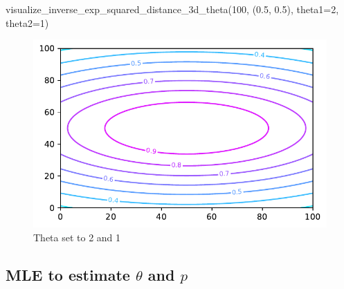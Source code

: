 \documentclass[
  letterpaper,
  DIV=11,
  numbers=noendperiod]{scrreprt}
\newenvironment{Shaded}{\begin{snugshade}}{\end{snugshade}}
\newcommand{\DecValTok}[1]{\textcolor[rgb]{0.68,0.00,0.00}{#1}}
\newcommand{\FloatTok}[1]{\textcolor[rgb]{0.68,0.00,0.00}{#1}}
\newcommand{\NormalTok}[1]{\textcolor[rgb]{0.00,0.23,0.31}{#1}}
\newcommand{\OperatorTok}[1]{\textcolor[rgb]{0.37,0.37,0.37}{#1}}
\begin{document}
\begin{Shaded}
\begin{Highlighting}[]
\NormalTok{visualize\_inverse\_exp\_squared\_distance\_3d\_theta(}\DecValTok{100}\NormalTok{, (}\FloatTok{0.5}\NormalTok{, }\FloatTok{0.5}\NormalTok{), theta1}\OperatorTok{=}\DecValTok{2}\NormalTok{, theta2}\OperatorTok{=}\DecValTok{1}\NormalTok{)}
\end{Highlighting}
\end{Shaded}

\begin{figure}[H]

{\centering \includegraphics{006_num_gp_files/figure-pdf/fig-theta12-output-1.pdf}

}

\caption{\label{fig-theta12}Theta set to 2 and 1}

\end{figure}

\hypertarget{mle-to-estimate-theta-and-p}{%
\subsection{\texorpdfstring{MLE to estimate \(\theta\) and
\(p\)}{MLE to estimate \textbackslash theta and p}}\label{mle-to-estimate-theta-and-p}}
\end{document}
